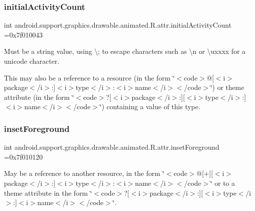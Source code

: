 \subsubsection{\texorpdfstring{initial\+Activity\+Count}{initialActivityCount}}
{\footnotesize\ttfamily int android.\+support.\+graphics.\+drawable.\+animated.\+R.\+attr.\+initial\+Activity\+Count =0x7f010043\hspace{0.3cm}{\ttfamily [static]}}

Must be a string value, using \textquotesingle{}\textbackslash{};\textquotesingle{} to escape characters such as \textquotesingle{}\textbackslash{}n\textquotesingle{} or \textquotesingle{}\textbackslash{}uxxxx\textquotesingle{} for a unicode character. 

This may also be a reference to a resource (in the form \char`\"{}$<$code$>$@\mbox{[}$<$i$>$package$<$/i$>$\+:\mbox{]}$<$i$>$type$<$/i$>$\+:$<$i$>$name$<$/i$>$$<$/code$>$\char`\"{}) or theme attribute (in the form \char`\"{}$<$code$>$?\mbox{[}$<$i$>$package$<$/i$>$\+:\mbox{]}\mbox{[}$<$i$>$type$<$/i$>$\+:\mbox{]}$<$i$>$name$<$/i$>$$<$/code$>$\char`\"{}) containing a value of this type. \mbox{\label{classandroid_1_1support_1_1graphics_1_1drawable_1_1animated_1_1R_1_1attr_adcb520b2e17981d734985a6dcf1bf4dc}} 
\subsubsection{\texorpdfstring{inset\+Foreground}{insetForeground}}
{\footnotesize\ttfamily int android.\+support.\+graphics.\+drawable.\+animated.\+R.\+attr.\+inset\+Foreground =0x7f010120\hspace{0.3cm}{\ttfamily [static]}}

May be a reference to another resource, in the form \char`\"{}$<$code$>$@\mbox{[}+\mbox{]}\mbox{[}$<$i$>$package$<$/i$>$\+:\mbox{]}$<$i$>$type$<$/i$>$\+:$<$i$>$name$<$/i$>$$<$/code$>$\char`\"{} or to a theme attribute in the form \char`\"{}$<$code$>$?\mbox{[}$<$i$>$package$<$/i$>$\+:\mbox{]}\mbox{[}$<$i$>$type$<$/i$>$\+:\mbox{]}$<$i$>$name$<$/i$>$$<$/code$>$\char`\"{}. 

